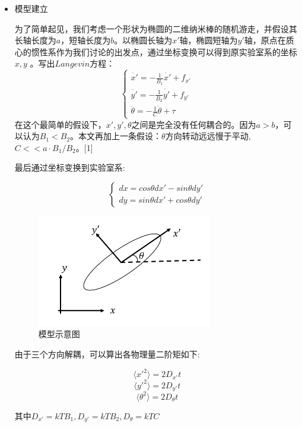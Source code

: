 \documentclass[UTF8]{ctexart}
\begin{document}
	\begin{itemize}
		\item 模型建立
		
		为了简单起见，我们考虑一个形状为椭圆的二维纳米棒的随机游走，并假设其长轴长度为$a$，短轴长度为$b$。以椭圆长轴为$x'$轴，椭圆短轴为$y'$轴，原点在质心的惯性系作为我们讨论的出发点，通过坐标变换可以得到原实验室系的坐标$x,y$ 。写出$Langevin$方程：
		$$\left\{
		\begin{array}{lcl}
			 \ddot{x'}=-\frac{1}{B_1}\dot{x'}+f_{x'}\\
			\ddot{y'}=-\frac{1}{B_2}\dot{y'}+f_{y'}\\
			\ddot{\theta}=-\frac{1}{C}\dot{\theta}+\tau
		\end{array} \right.$$
		在这个最简单的假设下，$x',y',\theta$之间是完全没有任何耦合的。因为$a>b$，可以认为$B_1<B_2$。本文再加上一条假设：$\theta$方向转动远远慢于平动,$C<<a\cdot B_1/B_2$。[1]
		
		最后通过坐标变换到实验室系:
		
			$$\left\{
		\begin{array}{lcl}
		dx=cos\theta dx'-sin\theta dy'\\
		dy=sin\theta dx'+cos\theta  dy'
	
		\end{array} \right.$$
		
				\begin{figure}[H]
				\centering  %
				\includegraphics[width=3in]{1}
				\caption{模型示意图}
			\end{figure}
	


\begin{flushleft}
		由于三个方向解耦，可以算出各物理量二阶矩如下:
\end{flushleft}
	
	$$\langle x'^2 \rangle=2D_{x'}t$$
	$$\langle y'^2 \rangle=2D_{y'}t$$
	$$\langle \theta^2 \rangle=2D_\theta t$$
	\begin{flushleft}
		其中$D_{x'}=kTB_1,D_{y'}=kTB_2,D_\theta=kTC$
	\end{flushleft}


\end{itemize}
\end{document}
